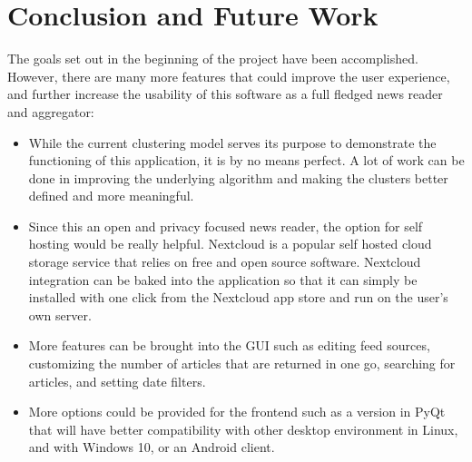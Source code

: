 \documentclass[12pt]{article}
\begin{document}
\section{Conclusion and Future Work}

The goals set out in the beginning of the project have been accomplished. However, there are many more features that could improve the user experience, and further increase the usability of this software as a full fledged news reader and aggregator:
\begin{itemize}
  \item While the current clustering model serves its purpose to demonstrate the functioning of this application, it is by no means perfect. A lot of work can be done in improving the underlying algorithm and making the clusters better defined and more meaningful.
  \item Since this an open and privacy focused news reader, the option for self hosting would be really helpful. Nextcloud is a popular self hosted cloud storage service that relies on free and open source software. Nextcloud integration can be baked into the application so that it can simply be installed with one click from the Nextcloud app store and run on the user's own server.
  \item More features can be brought into the GUI such as editing feed sources, customizing the number of articles that are returned in one go, searching for articles, and setting date filters.
  \item More options could be provided for the frontend such as a version in PyQt that will have better compatibility with other desktop environment in Linux, and with Windows 10, or an Android client.
\end{itemize}


{}

\end{document}
